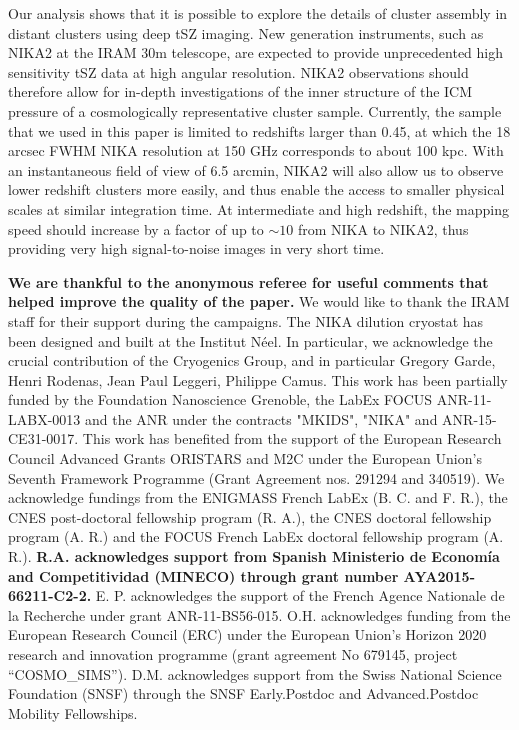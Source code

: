 \documentclass[twocolumn,traditabstract]{aa}
\begin{document}
Our analysis shows that it is possible to explore the details of cluster assembly in distant clusters using deep tSZ imaging. New generation instruments, such as NIKA2 \citep{Calvo2016,Catalano2016,NIKA2017} at the IRAM 30m telescope, are expected to provide unprecedented high sensitivity tSZ data at high angular resolution. NIKA2 observations \citep[such as the ones of the tSZ large program,][]{Comis2016,Mayet2017} should therefore allow for in-depth investigations of the inner structure of the ICM pressure of a cosmologically representative cluster sample. Currently, the sample that we used in this paper is limited to redshifts larger than 0.45, at which the 18 arcsec FWHM NIKA resolution at 150 GHz corresponds to about 100 kpc. With an instantaneous field of view of 6.5 arcmin, NIKA2 will also allow us to observe lower redshift clusters more easily, and thus enable the access to smaller physical scales at similar integration time. At intermediate and high redshift, the mapping speed should increase by a factor of up to $\sim 10$ from NIKA to NIKA2, thus providing very high signal-to-noise images in very short time.

\begin{acknowledgements}
{\bf We are thankful to the anonymous referee for useful comments that helped improve the quality of the paper.}
We would like to thank the IRAM staff for their support during the campaigns. 
The NIKA dilution cryostat has been designed and built at the Institut N\'eel. In particular, we acknowledge the crucial contribution of the Cryogenics Group, and  in particular Gregory Garde, Henri Rodenas, Jean Paul Leggeri, Philippe Camus. 
This work has been partially funded by the Foundation Nanoscience Grenoble, the LabEx FOCUS ANR-11-LABX-0013 and the ANR under the contracts "MKIDS", "NIKA" and ANR-15-CE31-0017. 
This work has benefited from the support of the European Research Council Advanced Grants ORISTARS and M2C under the European Union's Seventh Framework Programme (Grant Agreement nos. 291294 and 340519).
We acknowledge fundings from the ENIGMASS French LabEx (B. C. and F. R.), the CNES post-doctoral fellowship program (R. A.),  the CNES doctoral fellowship program (A. R.) and the FOCUS French LabEx doctoral fellowship program (A. R.).
{\bf R.A. acknowledges support from Spanish Ministerio de Econom\'ia and Competitividad (MINECO) through grant number AYA2015-66211-C2-2.}
E. P. acknowledges the support of the French Agence Nationale de la Recherche under grant ANR-11-BS56-015.
O.H. acknowledges funding from the European Research Council (ERC) under the European Union's Horizon 2020 research and innovation programme (grant agreement No 679145, project “COSMO\_SIMS”).
D.M. acknowledges support from the Swiss National Science Foundation (SNSF) through the SNSF Early.Postdoc and Advanced.Postdoc Mobility Fellowships. 
\end{acknowledgements}
\end{document}

